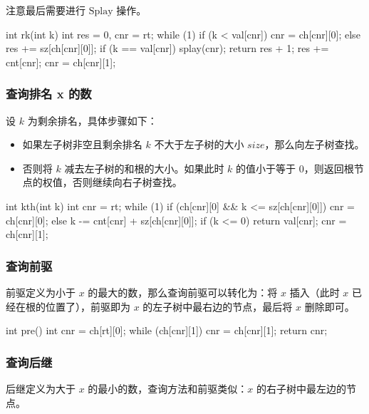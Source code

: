 注意最后需要进行 $\text{Splay}$ 操作。

\begin{cppcode}
int rk(int k) {
  int res = 0, cnr = rt;
  while (1) {
    if (k < val[cnr]) {
      cnr = ch[cnr][0];
    } else {
      res += sz[ch[cnr][0]];
      if (k == val[cnr]) {
        splay(cnr);
        return res + 1;
      }
      res += cnt[cnr];
      cnr = ch[cnr][1];
    }
  }
}
\end{cppcode}

\subsubsection{查询排名 x 的数}

设 $k$ 为剩余排名，具体步骤如下：

\begin{itemize}
\item 如果左子树非空且剩余排名 $k$ 不大于左子树的大小 $size$，那么向左子树查找。
\item 否则将 $k$ 减去左子树的和根的大小。如果此时 $k$ 的值小于等于 $0$，则返回根节点的权值，否则继续向右子树查找。
\end{itemize}

\begin{cppcode}
int kth(int k) {
  int cnr = rt;
  while (1) {
    if (ch[cnr][0] && k <= sz[ch[cnr][0]]) {
      cnr = ch[cnr][0];
    } else {
      k -= cnt[cnr] + sz[ch[cnr][0]];
      if (k <= 0) return val[cnr];
      cnr = ch[cnr][1];
    }
  }
}
\end{cppcode}

\subsubsection{查询前驱}

前驱定义为小于 $x$ 的最大的数，那么查询前驱可以转化为：将 $x$ 插入（此时 $x$ 已经在根的位置了），前驱即为 $x$ 的左子树中最右边的节点，最后将 $x$ 删除即可。

\begin{cppcode}
int pre() {
  int cnr = ch[rt][0];
  while (ch[cnr][1]) cnr = ch[cnr][1];
  return cnr;
}
\end{cppcode}

\subsubsection{查询后继}

后继定义为大于 $x$ 的最小的数，查询方法和前驱类似：$x$ 的右子树中最左边的节点。

